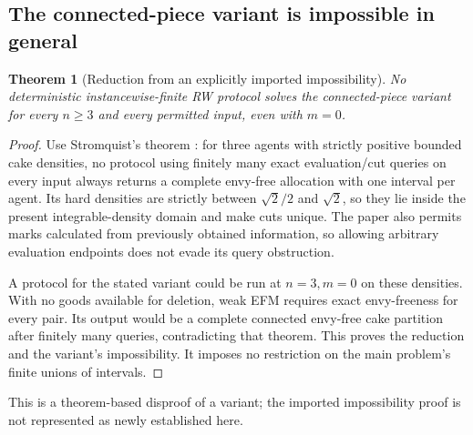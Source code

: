 \documentclass[11pt,a4paper]{article}
\newtheorem{theorem}{Theorem}[section]
\theoremstyle{remark}\newtheorem{remark}[theorem]{Remark}
\begin{document}
\subsection{The connected-piece variant is impossible in general}
\begin{theorem}[Reduction from an explicitly imported impossibility]\label{thm:connected}
No deterministic instancewise-finite RW protocol solves the connected-piece variant for every $n\ge3$ and every permitted input, even with $m=0$.
\end{theorem}
\begin{proof}
Use Stromquist's theorem \cite{strom}: for three agents with strictly positive bounded cake densities, no protocol using finitely many exact evaluation/cut queries on every input always returns a complete envy-free allocation with one interval per agent. Its hard densities are strictly between $\sqrt2/2$ and $\sqrt2$, so they lie inside the present integrable-density domain and make cuts unique. The paper also permits marks calculated from previously obtained information, so allowing arbitrary evaluation endpoints does not evade its query obstruction.

A protocol for the stated variant could be run at $n=3,m=0$ on these densities. With no goods available for deletion, weak EFM requires exact envy-freeness for every pair. Its output would be a complete connected envy-free cake partition after finitely many queries, contradicting that theorem. This proves the reduction and the variant's impossibility. It imposes no restriction on the main problem's finite unions of intervals.
\end{proof}
This is a theorem-based disproof of a variant; the imported impossibility proof is not represented as newly established here.
\end{document}
